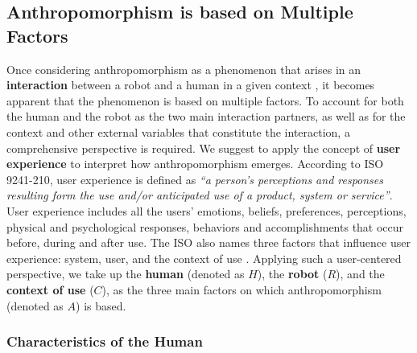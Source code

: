 \documentclass{frontiersSCNS} %
\begin{document}
\subsection{Anthropomorphism is based on Multiple Factors}
\label{sec:multiple-factors}


Once considering anthropomorphism as a phenomenon that arises in an \textbf{interaction} between a robot and a human in a given context \citep{persson_anthropomorphism_2000}, it becomes apparent that the phenomenon is based on multiple factors.
To account for both the human and the robot as the two main interaction partners, as well as for the context and other external variables that constitute the interaction, a comprehensive perspective is required. We suggest to apply the concept of \textbf{user experience} to interpret how anthropomorphism emerges. According to ISO 9241-210, user experience is defined as \textit{``a person's perceptions and responses resulting form the use and/or anticipated use of a product, system or service''}. User experience includes all the users' emotions, beliefs, preferences, perceptions, physical and psychological responses, behaviors and accomplishments that occur before, during and after use. The ISO also names three factors that influence user experience: system, user, and the context of use \citep{iso_ergonomics_2010}.
Applying such a user-centered perspective, we take up the \textbf{human} (denoted as $H$), the \textbf{robot} ($R$), and the \textbf{context of use} ($C$), as the three main factors on which anthropomorphism (denoted as $A$) is based.

\subsubsection{Characteristics of the Human\\}
\label{sec:factor-human}
\end{document}
